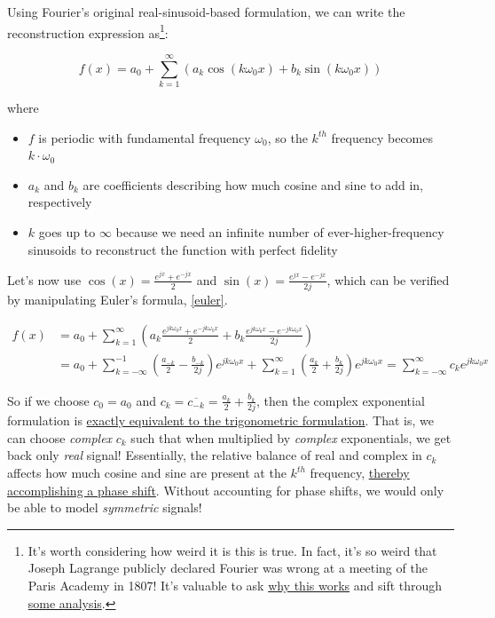 \documentclass[10pt]{article}
\begin{document}
Using Fourier's original real-sinusoid-based formulation, we can write the reconstruction expression as\footnote{It's worth considering how weird it is this is true. In fact, it's so weird that Joseph Lagrange publicly declared Fourier was wrong at a meeting of the Paris Academy in 1807!\cite{michigan} It's valuable to ask \href{https://math.stackexchange.com/questions/1105265/why-do-fourier-series-work}{why this works}\cite{why} and sift through \href{https://math.uchicago.edu/~may/REU2017/REUPapers/Xue.pdf}{some analysis}.\cite{chicago}}:

$$ f(x) = a_0 + \sum_{k=1}^{\infty} (a_k \cos(k \omega_0 x) + b_k \sin(k \omega_0 x))$$

where
\begin{itemize}[noitemsep, topsep=0pt, after=\newline]
	\item $f$ is periodic with fundamental frequency $\omega_0$, so the $k^{th}$ frequency becomes $k \cdot \omega_0$
	\item $a_k$ and $b_k$ are coefficients describing how much cosine and sine to add in, respectively
	\item $k$ goes up to $\infty$ because we need an infinite number of ever-higher-frequency sinusoids to reconstruct the function with perfect fidelity
\end{itemize}

Let's now use $\cos(x) = \frac{e^{jx} + e^{-jx}}{2}$ and $\sin(x) = \frac{e^{jx} - e^{-jx}}{2j}$, which can be verified by manipulating Euler's formula, \autoref{euler}.

\begin{align*}
f(x) &= a_0 + \sum_{k=1}^{\infty} (a_k \frac{e^{j k \omega_0 x} + e^{-j k \omega_0 x}}{2} + b_k \frac{e^{j k \omega_0 x} - e^{-j k \omega_0 x}}{2j}) \\
&= a_0 + \sum_{k = -\infty}^{-1} (\frac{a_{-k}}{2} - \frac{b_{-k}}{2j}) e^{j k \omega_0 x} + \sum_{k = 1}^{\infty} (\frac{a_k}{2} + \frac{b_k}{2j}) e^{j k \omega_0 x} = \sum_{k = -\infty}^{\infty} c_k e^{j k \omega_0 x}
\end{align*}

\label{phase}
So if we choose $c_0 = a_0$ and $c_k = \overline{c_{-k}} = \frac{a_k}{2} + \frac{b_k}{2j}$, then the complex exponential formulation is \href{http://lpsa.swarthmore.edu/Fourier/Series/DerFS.html}{exactly equivalent to the trigonometric formulation}\cite{swarthmore}. That is, we can choose \textit{complex} $c_k$ such that when multiplied by \textit{complex} exponentials, we get back only \textit{real} signal! Essentially, the relative balance of real and complex in $c_k$ affects how much cosine and sine are present at the $k^{th}$ frequency, \href{https://dsego.github.io/demystifying-fourier/}{thereby accomplishing a phase shift}\cite{sego}. Without accounting for phase shifts, we would only be able to model \textit{symmetric} signals!
\end{document}
